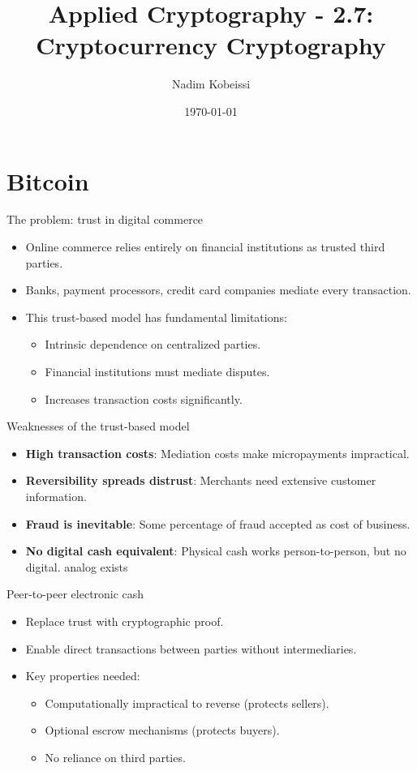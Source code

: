 \documentclass[aspectratio=169, lualatex, handout]{beamer}
\title{Applied Cryptography - 2.7: Cryptocurrency Cryptography}
\author{Nadim Kobeissi}
\institute{American University of Beirut}
\date{\today}
\begin{document}
\begin{frame}[plain]
	\titlepage
\end{frame}

\section{Bitcoin}

\begin{frame}{The problem: trust in digital commerce}
	\begin{itemize}
		\item Online commerce relies entirely on financial institutions as trusted third parties.
		\item Banks, payment processors, credit card companies mediate every transaction.
		\item This trust-based model has fundamental limitations:
		      \begin{itemize}
			      \item Intrinsic dependence on centralized parties.
			      \item Financial institutions must mediate disputes.
			      \item Increases transaction costs significantly.
		      \end{itemize}
	\end{itemize}
\end{frame}

\begin{frame}{Weaknesses of the trust-based model}
	\begin{itemize}
		\item \textbf{High transaction costs}: Mediation costs make micropayments impractical.
		\item \textbf{Reversibility spreads distrust}: Merchants need extensive customer information.
		\item \textbf{Fraud is inevitable}: Some percentage of fraud accepted as cost of business.
		\item \textbf{No digital cash equivalent}: Physical cash works person-to-person, but no digital. analog exists
	\end{itemize}
\end{frame}

\begin{frame}{Peer-to-peer electronic cash}
	\begin{itemize}
		\item Replace trust with cryptographic proof.
		\item Enable direct transactions between parties without intermediaries.
		\item Key properties needed:
		      \begin{itemize}
			      \item Computationally impractical to reverse (protects sellers).
			      \item Optional escrow mechanisms (protects buyers).
			      \item No reliance on third parties.
		      \end{itemize}
	\end{itemize}
\end{frame}
\end{document}
